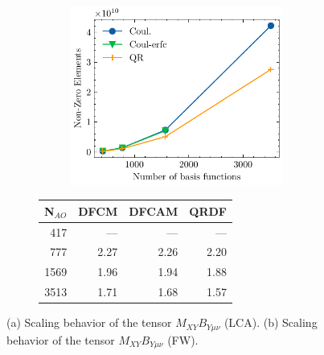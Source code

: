 \begin{figure}[htp]
\begin{subfigure}{\textwidth}
\begin{subfigure}{0.45\textwidth}
\includegraphics[width=\textwidth]{Pics/cfit_nze_fw}
\end{subfigure}
\hfill
\begin{subtable}{0.45\textwidth}
\begin{tabular}{rrrr}
\hline
N$_{AO}$ & DFCM & DFCAM & QRDF \\ \hline
417 & --- & --- & --- \\ 
777 & 2.27 & 2.26 & 2.20 \\ 
1569 & 1.96 & 1.94 & 1.88 \\ 
3513 & 1.71 & 1.68 & 1.57 \\ \hline
\end{tabular}
\end{subtable}
\caption{}
\label{fig:GS_MBNZE_FW}
\end{subfigure}
%

\caption[Scaling behavior of the tensor $M_{XY}B_{Y\mu\nu}$]{(a) Scaling behavior of the tensor $M_{XY}B_{Y\mu\nu}$ (LCA). (b) Scaling behavior of the tensor $M_{XY}B_{Y\mu\nu}$ (FW).}

\end{figure}